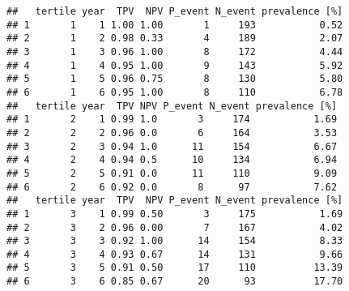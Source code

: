 \documentclass[
]{article}
\begin{document}
\begin{verbatim}
##   tertile year  TPV  NPV P_event N_event prevalence [%]
## 1       1    1 1.00 1.00       1     193           0.52
## 2       1    2 0.98 0.33       4     189           2.07
## 3       1    3 0.96 1.00       8     172           4.44
## 4       1    4 0.95 1.00       9     143           5.92
## 5       1    5 0.96 0.75       8     130           5.80
## 6       1    6 0.95 1.00       8     110           6.78
##   tertile year  TPV NPV P_event N_event prevalence [%]
## 1       2    1 0.99 1.0       3     174           1.69
## 2       2    2 0.96 0.0       6     164           3.53
## 3       2    3 0.94 1.0      11     154           6.67
## 4       2    4 0.94 0.5      10     134           6.94
## 5       2    5 0.91 0.0      11     110           9.09
## 6       2    6 0.92 0.0       8      97           7.62
##   tertile year  TPV  NPV P_event N_event prevalence [%]
## 1       3    1 0.99 0.50       3     175           1.69
## 2       3    2 0.96 0.00       7     167           4.02
## 3       3    3 0.92 1.00      14     154           8.33
## 4       3    4 0.93 0.67      14     131           9.66
## 5       3    5 0.91 0.50      17     110          13.39
## 6       3    6 0.85 0.67      20      93          17.70
\end{verbatim}
\end{document}
